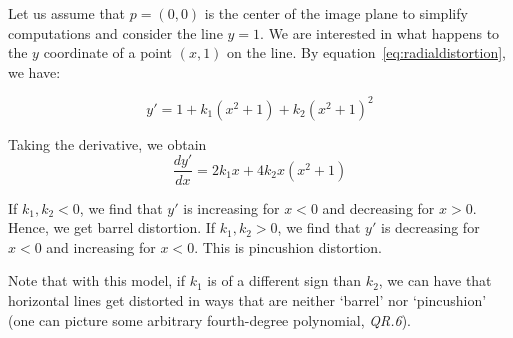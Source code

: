 Let us assume that $p=(0,0)$ is the center of the image plane to simplify computations and consider the line $y=1$.
We are interested in what happens to the $y$ coordinate of a point $(x,1)$ on the line.
By equation~\eqref{eq:radialdistortion}, we have:

\[y'=1+k_1 (x^2+1)+k_2 (x^2+1)^2\]

Taking the derivative, we obtain
\[\frac{dy'}{dx}=2k_1 x+4k_2 x(x^2+1)\]

If $k_1,k_2<0$, we find that $y'$ is increasing for $x<0$ and decreasing for $x>0$.
Hence, we get barrel distortion.
If $k_1,k_2>0$, we find that $y'$ is decreasing for $x<0$ and increasing for $x<0$.
This is pincushion distortion.

Note that with this model, if $k_1$ is of a different sign than $k_2$, we can have that horizontal lines get distorted
in ways that are neither \enquote*{barrel} nor \enquote*{pincushion} (one can picture some arbitrary fourth-degree
polynomial, \textit{QR.6}).